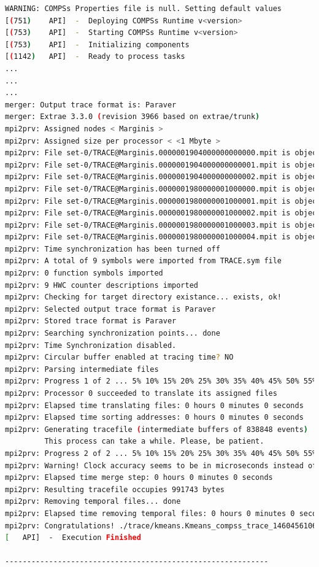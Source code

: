 \begin{lstlisting}[language=bash]
WARNING: COMPSs Properties file is null. Setting default values
[(751)    API]  -  Deploying COMPSs Runtime v<version>
[(753)    API]  -  Starting COMPSs Runtime v<version>
[(753)    API]  -  Initializing components
[(1142)   API]  -  Ready to process tasks
...
...
...
merger: Output trace format is: Paraver
merger: Extrae 3.3.0 (revision 3966 based on extrae/trunk)
mpi2prv: Assigned nodes < Marginis >
mpi2prv: Assigned size per processor < <1 Mbyte >
mpi2prv: File set-0/TRACE@Marginis.0000001904000000000000.mpit is object 1.1.1 on node Marginis assigned to processor 0
mpi2prv: File set-0/TRACE@Marginis.0000001904000000000001.mpit is object 1.1.2 on node Marginis assigned to processor 0
mpi2prv: File set-0/TRACE@Marginis.0000001904000000000002.mpit is object 1.1.3 on node Marginis assigned to processor 0
mpi2prv: File set-0/TRACE@Marginis.0000001980000001000000.mpit is object 1.2.1 on node Marginis assigned to processor 0
mpi2prv: File set-0/TRACE@Marginis.0000001980000001000001.mpit is object 1.2.2 on node Marginis assigned to processor 0
mpi2prv: File set-0/TRACE@Marginis.0000001980000001000002.mpit is object 1.2.3 on node Marginis assigned to processor 0
mpi2prv: File set-0/TRACE@Marginis.0000001980000001000003.mpit is object 1.2.4 on node Marginis assigned to processor 0
mpi2prv: File set-0/TRACE@Marginis.0000001980000001000004.mpit is object 1.2.5 on node Marginis assigned to processor 0
mpi2prv: Time synchronization has been turned off
mpi2prv: A total of 9 symbols were imported from TRACE.sym file
mpi2prv: 0 function symbols imported
mpi2prv: 9 HWC counter descriptions imported
mpi2prv: Checking for target directory existance... exists, ok!
mpi2prv: Selected output trace format is Paraver
mpi2prv: Stored trace format is Paraver
mpi2prv: Searching synchronization points... done
mpi2prv: Time Synchronization disabled.
mpi2prv: Circular buffer enabled at tracing time? NO
mpi2prv: Parsing intermediate files
mpi2prv: Progress 1 of 2 ... 5% 10% 15% 20% 25% 30% 35% 40% 45% 50% 55% 60% 65% 70% 75% 80% 85% 90% 95% done
mpi2prv: Processor 0 succeeded to translate its assigned files
mpi2prv: Elapsed time translating files: 0 hours 0 minutes 0 seconds
mpi2prv: Elapsed time sorting addresses: 0 hours 0 minutes 0 seconds
mpi2prv: Generating tracefile (intermediate buffers of 838848 events)
         This process can take a while. Please, be patient.
mpi2prv: Progress 2 of 2 ... 5% 10% 15% 20% 25% 30% 35% 40% 45% 50% 55% 60% 65% 70% 75% 80% 85% 90% 95% done
mpi2prv: Warning! Clock accuracy seems to be in microseconds instead of nanoseconds.
mpi2prv: Elapsed time merge step: 0 hours 0 minutes 0 seconds
mpi2prv: Resulting tracefile occupies 991743 bytes
mpi2prv: Removing temporal files... done
mpi2prv: Elapsed time removing temporal files: 0 hours 0 minutes 0 seconds
mpi2prv: Congratulations! ./trace/kmeans.Kmeans_compss_trace_1460456106.prv has been generated.
[   API]  -  Execution Finished

------------------------------------------------------------
\end{lstlisting}

